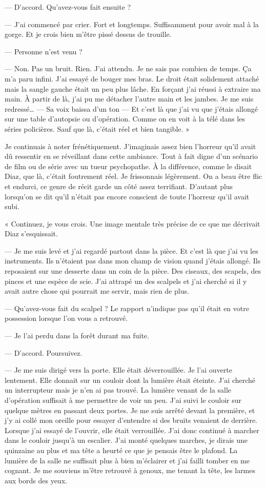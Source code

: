 — D'accord. Qu'avez-vous fait ensuite ?

— J'ai commencé par crier. Fort et longtemps. Suffisamment pour avoir mal à la gorge. Et je crois bien m'être pissé
dessus de trouille.

— Personne n'est venu ?

— Non. Pas un bruit. Rien. J'ai attendu. Je ne sais pas combien de temps. Ça m'a paru infini. J'ai essayé de bouger mes
bras. Le droit était solidement attaché mais la sangle gauche était un peu plus lâche. En forçant j'ai réussi à
extraire ma main. À partir de là, j'ai pu me détacher l'autre main et les jambes. Je me suis redressé… — Sa voix baissa
d'un ton — Et c'est là que j'ai vu que j'étais allongé sur une table d'autopsie ou d'opération. Comme on en voit à la
télé dans les séries policières. Sauf que là, c'était réel et bien tangible. »

Je continuais à noter frénétiquement. J'imaginais assez bien l'horreur qu'il avait dû ressentir en se réveillant dans
cette ambiance. Tout à fait digne d'un scénario de film ou de série avec un tueur psychopathe. À la différence, comme
le disait Diaz, que là, c'était foutrement réel. Je frissonnais légèrement. On a beau être flic et endurci, ce genre de
récit garde un côté assez terrifiant. D'autant plus lorsqu'on se dit qu'il n'était pas encore conscient de toute 
l'horreur qu'il avait subi. 

« Continuez, je vous crois. Une image mentale très précise de ce que me décrivait Diaz s'esquissait.

— Je me suis levé et j'ai regardé partout dans la pièce. Et c'est là que j'ai vu les instruments. Ils n'étaient pas
dans mon champ de vision quand j'étais allongé. Ils reposaient sur une desserte dans un coin de la pièce. Des ciseaux,
des scapels, des pinces et une espèce de scie. J'ai attrapé un des scalpels et j'ai cherché si il y avait autre chose
qui pourrait me servir, mais rien de plus.

— Qu'avez-vous fait du scalpel ? Le rapport n'indique pas qu'il était en votre possession lorsque l'on vous a retrouvé.

— Je l'ai perdu dans la forêt durant ma fuite.

— D'accord. Poursuivez.

— Je me suis dirigé vers la porte. Elle était déverrouillée. Je l'ai ouverte lentement. Elle donnait sur un couloir
dont la lumière était éteinte. J'ai cherché un interrupteur mais je n'en ai pas trouvé. La lumière venant de la
salle d'opération suffisait à me permettre de voir un peu. J'ai suivi le couloir sur quelque mètres en passant deux
portes. Je me suis arrêté devant la première, et j'y ai collé mon oreille pour essayer d'entendre si des bruits venaient
de derrière. Lorsque j'ai essayé de l'ouvrir, elle était verrouillée. J'ai donc continué à marcher dans le couloir
jusqu'à un escalier. J'ai monté quelques marches, je dirais une quinzaine au plus et ma tête a heurté ce que je pensais
être le plafond. La lumière de la salle ne suffisait plus à bien m'éclairer et j'ai failli tomber en me cognant. Je me
souviens m'être retrouvé à genoux, me tenant la tête, les larmes aux bords des yeux.

